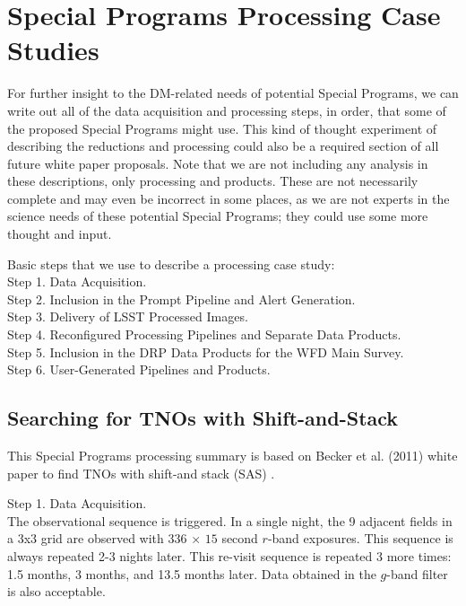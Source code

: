 \documentclass[DM,lsstdoc,toc]{lsstdoc}
\begin{document}
\section{Special Programs Processing Case Studies}\label{sec:SPCS}

For further insight to the DM-related needs of potential Special Programs, we can write out all of the data acquisition and processing steps, in order, that some of the proposed Special Programs might use. This kind of thought experiment of describing the reductions and processing could also be a required section of all future white paper proposals. Note that we are not including any analysis in these descriptions, only processing and products. These are not necessarily complete and may even be incorrect in some places, as we are not experts in the science needs of these potential Special Programs; they could use some more thought and input.

Basic steps that we use to describe a processing case study: \\
Step 1. Data Acquisition. \\
Step 2. Inclusion in the Prompt Pipeline and Alert Generation. \\
Step 3. Delivery of LSST Processed Images. \\
Step 4. Reconfigured Processing Pipelines and Separate Data Products. \\
Step 5. Inclusion in the DRP Data Products for the WFD Main Survey. \\
Step 6. User-Generated Pipelines and Products. \\


\subsection{Searching for TNOs with Shift-and-Stack}\label{ssec:SPCS_TNO}

This Special Programs processing summary is based on Becker et al. (2011) white paper to find TNOs with shift-and stack (SAS) .

Step 1. Data Acquisition. \\
The observational sequence is triggered. In a single night, the 9 adjacent fields in a 3x3 grid are observed with $336$ $\times$ $15$ second $r$-band exposures. This sequence is always repeated 2-3 nights later. This re-visit sequence is repeated 3 more times: 1.5 months, 3 months, and 13.5 months later. Data obtained in the $g$-band filter is also acceptable. 
\end{document}

